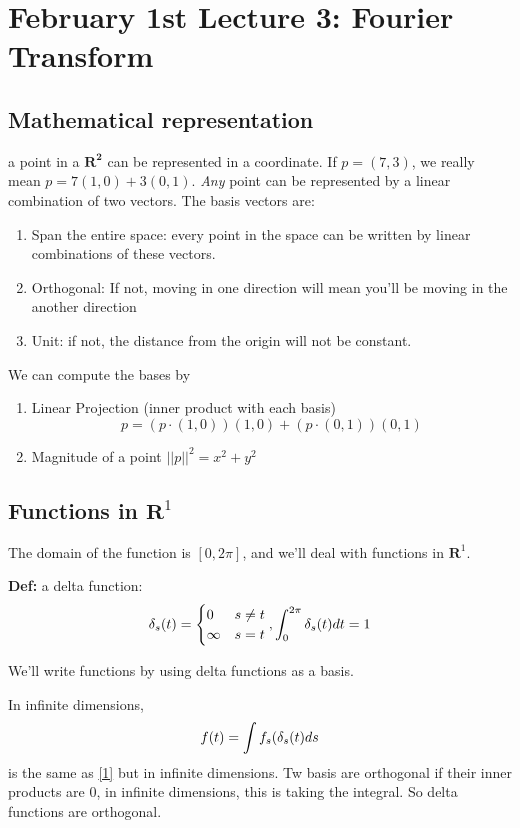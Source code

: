 \section{February 1st Lecture 3: Fourier Transform}
\label{sec:lec3}

\subsection{Mathematical representation}

\label{sec:math-repr}
a point in a $\mathbf{R^2}$ can be represented in a
coordinate. If $p=(7,3)$, we really mean $p = 7(1,0) +
3(0,1)$. \emph{Any} point can be represented by a linear combination
of two vectors. The basis vectors are:
\begin{enumerate}
\item Span the entire space: every point in the space can be written by  linear combinations of these vectors.
\item Orthogonal: If not, moving in one direction will mean you'll be
  moving in the another direction 
\item Unit: if not, the distance from the origin will not be constant.
\end{enumerate}

We can compute the bases by
\begin{enumerate}
\item Linear Projection (inner product with each basis) 
  \begin{equation}
p = (p\cdot
  (1,0))(1,0) + (p\cdot (0,1))(0,1)\label{eq:1}  
\end{equation}
\item Magnitude of a point $||p||^2 = x^2 + y^2$
\end{enumerate}

\subsection{Functions in $\mathbf{R}^1$}
The domain of the function is $[0,2\pi]$, and we'll deal with
functions in $\mathbf{R}^1$.

\textbf{Def:} a delta function: $$\delta_s(t) =
\begin{cases}
  0 & s\neq t\\
\infty & s=t
\end{cases}, \int_0^{2\pi}\delta_s(t) dt = 1$$

We'll write functions by using delta functions as a basis.

In infinite dimensions, 
$$f(t) = \int f_s(\delta_s(t)ds$$ is the same as \eqref{1} but in
infinite dimensions. 
Tw basis are orthogonal if their inner products are 0, in infinite
dimensions, this is taking the integral. So delta functions are orthogonal.

